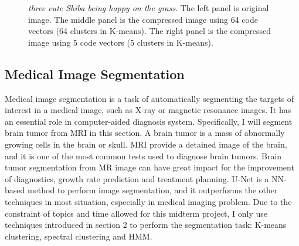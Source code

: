 \documentclass[a4paper]{article}
\begin{document}
\begin{figure}[h!]%
    \centering
    \caption{\textit{three cute Shiba being happy on the grass}. The left panel is original image. The middle panel is the compressed image using 64 code vectors (64 clusters in K-means). The right panel is the compressed image using 5 code vectors (5 clusters in K-means).}
\end{figure}


\subsection{Medical Image Segmentation}

Medical image segmentation is a task of automatically segmenting the targets of interest in a medical image, such as X-ray or magnetic resonance images. It has an essential role in computer-aided diagnosis system. Specifically, I will segment brain tumor from MRI in this section. A brain tumor is a mass of abnormally growing cells in the brain or skull. MRI  provide a detained image of the brain, and it is one of the most common tests used to diagnose brain tumors. Brain tumor segmentation from MR image can have great impact for the improvement of diagnostics, growth rate prediction and treatment planning. U-Net is a NN-based method to perform image segmentation, and it outperforms the other techniques in most situation, especially in medical imaging problem.  Due to the constraint of topics and time allowed for this midterm project, I only use techniques introduced in section 2 to perform the segmentation task: K-means clustering, spectral clustering and HMM.
\end{document}
